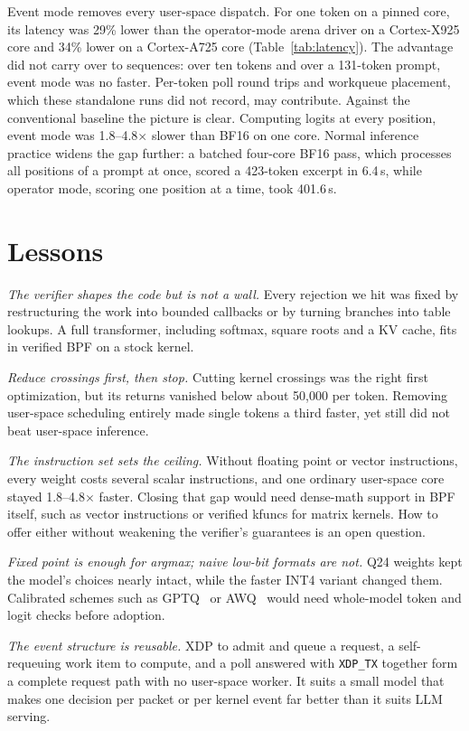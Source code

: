 \documentclass[sigconf,nonacm]{acmart}
\begin{document}
Event mode removes every user-space dispatch. For one token on a pinned core,
its latency was 29\% lower than the operator-mode arena driver on a
Cortex-X925 core and 34\% lower on a Cortex-A725 core
(Table~\ref{tab:latency}). The advantage did not carry over to sequences:
over ten tokens and over a 131-token prompt, event mode was no faster.
Per-token poll round trips and workqueue placement, which these standalone
runs did not record, may contribute. Against the conventional baseline the
picture is clear. Computing logits at every position, event mode was
1.8--4.8$\times$ slower than BF16 on one core. Normal inference practice
widens the gap further: a batched four-core BF16 pass, which processes all
positions of a prompt at once, scored a 423-token excerpt in 6.4\,s, while
operator mode, scoring one position at a time, took 401.6\,s.

\section{Lessons}
\label{sec:lessons}

\emph{The verifier shapes the code but is not a wall.} Every rejection we hit
was fixed by restructuring the work into bounded callbacks or by turning
branches into table lookups. A full transformer, including softmax, square
roots and a KV cache, fits in verified BPF on a stock kernel.

\emph{Reduce crossings first, then stop.} Cutting kernel crossings was the
right first optimization, but its returns vanished below about 50,000 per
token. Removing user-space scheduling entirely made single tokens a third
faster, yet still did not beat user-space inference.

\emph{The instruction set sets the ceiling.} Without floating point or vector
instructions, every weight costs several scalar instructions, and one
ordinary user-space core stayed 1.8--4.8$\times$ faster. Closing that gap
would need dense-math support in BPF itself, such as vector instructions or
verified kfuncs for matrix kernels. How to offer either without weakening the
verifier's guarantees is an open question.

\emph{Fixed point is enough for argmax; naive low-bit formats are not.} Q24
weights kept the model's choices nearly intact, while the faster INT4 variant
changed them. Calibrated schemes such as GPTQ~\cite{gptq} or AWQ~\cite{awq}
would need whole-model token and logit checks before adoption.

\emph{The event structure is reusable.} XDP to admit and queue a request, a
self-requeuing work item to compute, and a poll answered with
\texttt{XDP\_TX} together form a complete request path with no user-space
worker. It suits a small model that makes one decision per packet or per
kernel event far better than it suits LLM serving.
\end{document}
